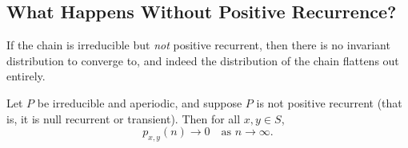 \documentclass[a4paper]{scrartcl}
\begin{document}
\subsection{What Happens Without Positive Recurrence?}

If the chain is irreducible but \emph{not} positive recurrent, then there is no invariant distribution to converge to, and indeed the distribution of the chain flattens out entirely.

\begin{theorem}
	Let $P$ be irreducible and aperiodic, and suppose $P$ is not positive recurrent (that is, it is null recurrent or transient). Then for all $x, y \in S$,
	$$
	p_{x, y}(n) \rightarrow 0 \quad \text{as } n \rightarrow \infty.
	$$
\end{theorem}
\end{document}
